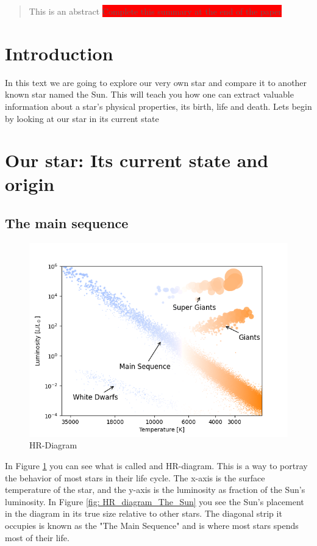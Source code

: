\documentclass[reprint,english,notitlepage]{revtex4-2}
\begin{document}
\title{}
\author{Candidates: 15369 \& 15401}
\date{\today}

\begin{abstract}
    This is an abstract \colorbox{red}{Complete this summary at the end of the paper}
\end{abstract}
\maketitle
\section{Introduction} \label{sec: introduction}
In this text we are going to explore our very own star and compare it to another known star named the Sun. This will teach you how one can extract valuable information about a star's physical properties, its birth, life and death. Lets begin by looking at our star in its current state      

\section{Our star: Its current state and origin}
\subsection{The main sequence}
\begin{figure}[h!]
  \centering
  \includegraphics[scale = .50]{figures/HR-Diagram_Classification}
  \caption{HR-Diagram}
  \label{fig: HR_diagram}
\end{figure}
In Figure \ref{fig: HR_diagram} you can see what is called and HR-diagram. This is a way to portray the behavior of most stars in their life cycle. The x-axis is the surface temperature of the star, and the y-axis is the luminosity as fraction of the Sun's luminosity. In Figure \ref{fig: HR_diagram_The_Sun} you see the Sun's placement in the diagram in its true size relative to other stars. The diagonal strip it occupies is known as the "The Main Sequence" and is where most stars spends most of their life. 
\end{document}
